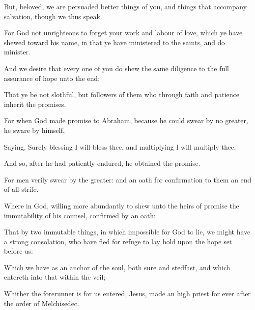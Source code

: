 {But,
beloved, we are
persuaded better
things
of
you,
and things that
accompany
salvation,
though
we
thus
speak.

For
God
{}
not
unrighteous to
forget
your
work
and
labour of
love,
which ye have
shewed
toward
his
name, in that ye have ministered
to the
saints,
and do
minister.

And we desire
that every
one of
you do
shew
the
same
diligence
to the full
assurance of
hope
unto the
end:

That ye
be
not
slothful,
but
followers of them
who
through
faith
and
patience
inherit the
promises.

For
when
God made
promise to
Abraham,
because he
could
swear
by
no
greater, he
sware
by
himself,

Saying,
Surely
blessing I will
bless
thee,
and
multiplying I will
multiply
thee.

And
so, after he had patiently
endured, he
obtained the
promise.

For
men
verily
swear
by the
greater:
and an
oath
for
confirmation
{} to
them an
end
of
all
strife.

Where
in
God,
willing more
abundantly to
shew unto the
heirs of
promise the
immutability
of
his
counsel,
confirmed
{} by an
oath:

That
by
two
immutable
things,
in
which
{}
impossible for
God to
lie, we might
have
a
strong
consolation, who have fled for
refuge to lay
hold upon the
hope set before
us:

Which
{} we
have
as an
anchor of the
soul,
both
sure
and
stedfast,
and which
entereth
into that
within the
veil;

Whither the
forerunner
is
for
us
entered,
{}
Jesus,
made an high
priest
for
ever
after the
order of
Melchisedec.




\par }
